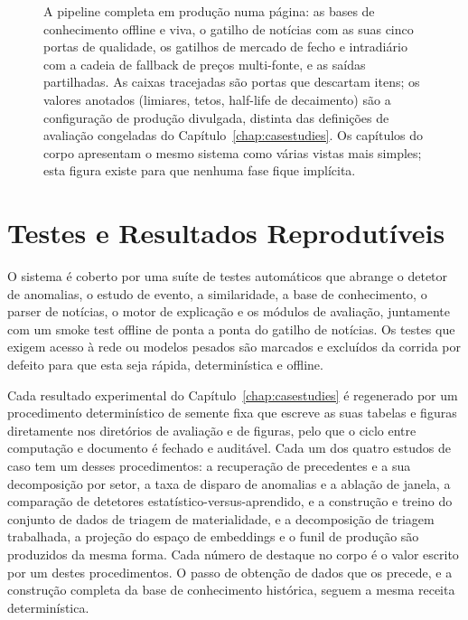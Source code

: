 \begin{figure}
\caption[A pipeline completa em produção, com cada porta anotada]{A pipeline completa em produção numa
página: as bases de conhecimento offline e viva, o gatilho de notícias com as suas cinco portas de
qualidade, os gatilhos de mercado de fecho e intradiário com a cadeia de fallback de preços
multi-fonte, e as saídas partilhadas. As caixas tracejadas são portas que descartam itens; os valores
anotados (limiares, tetos, half-life de decaimento) são a configuração de produção divulgada, distinta das
definições de avaliação congeladas do Capítulo~\ref{chap:casestudies}. Os capítulos do corpo apresentam o
mesmo sistema como várias vistas mais simples; esta figura existe para que nenhuma fase fique implícita.}
\label{fig:master_pipeline}
\end{figure}

\section{Testes e Resultados Reprodutíveis}
\label{app:repro_tests}

O sistema é coberto por uma suíte de testes automáticos que abrange o detetor de anomalias, o estudo de
evento, a similaridade, a base de conhecimento, o parser de notícias, o motor de explicação e os módulos de
avaliação, juntamente com um smoke test offline de ponta a ponta do gatilho de notícias. Os testes que
exigem acesso à rede ou modelos pesados são marcados e excluídos da corrida por defeito para que esta seja
rápida, determinística e offline.

Cada resultado experimental do Capítulo~\ref{chap:casestudies} é regenerado por um procedimento
determinístico de semente fixa que escreve as suas tabelas e figuras diretamente nos diretórios de
avaliação e de figuras, pelo que o ciclo entre computação e documento é fechado e auditável. Cada um dos
quatro estudos de caso tem um desses procedimentos: a recuperação de precedentes e a sua decomposição
por setor, a taxa de disparo de anomalias e a ablação de janela, a comparação de detetores
estatístico-versus-aprendido, e a construção e treino do conjunto de dados de triagem de materialidade,
e a decomposição de triagem trabalhada, a projeção do espaço de embeddings e o funil de produção são
produzidos da mesma forma. Cada número de destaque no corpo é o valor escrito por um destes procedimentos.
O passo de obtenção de dados que os precede, e a construção completa da base de
conhecimento histórica, seguem a mesma receita determinística.

